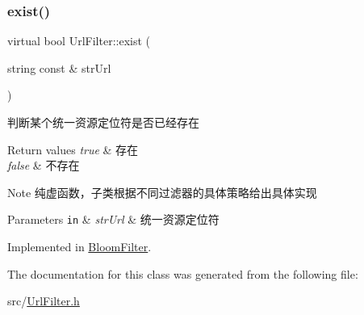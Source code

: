 \subsubsection{\texorpdfstring{exist()}{exist()}}
{\footnotesize\ttfamily virtual bool Url\+Filter\+::exist (\begin{DoxyParamCaption}\item[{string const \&}]{str\+Url }\end{DoxyParamCaption})\hspace{0.3cm}{\ttfamily [pure virtual]}}



判断某个统一资源定位符是否已经存在 


\begin{DoxyRetVals}{Return values}
{\em true} & 存在 \\
\hline
{\em false} & 不存在 \\
\hline
\end{DoxyRetVals}
\begin{DoxyNote}{Note}
纯虚函数，子类根据不同过滤器的具体策略给出具体实现 
\end{DoxyNote}

\begin{DoxyParams}[1]{Parameters}
\mbox{\tt in}  & {\em str\+Url} & 统一资源定位符 \\
\hline
\end{DoxyParams}


Implemented in \hyperlink{class_bloom_filter_a78a992167b8efbc3be672469e68c5e97}{Bloom\+Filter}.



The documentation for this class was generated from the following file\+:\begin{DoxyCompactItemize}
\item 
src/\hyperlink{_url_filter_8h}{Url\+Filter.\+h}\end{DoxyCompactItemize}
